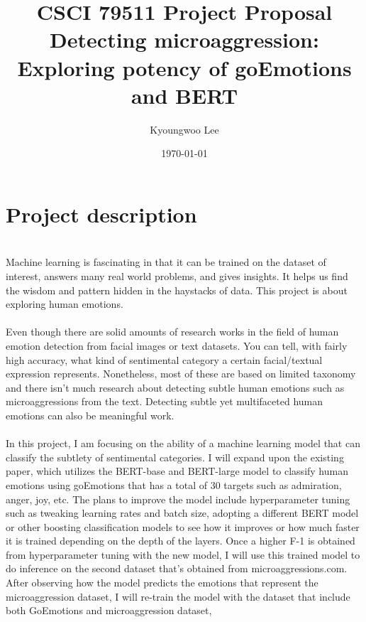 \documentclass[12pt]{main}
\title{
  CSCI 79511 Project Proposal\\ \vspace{3mm} 
  \large Detecting microaggression:
  \\ Exploring potency of goEmotions\cite{goEmotions} and BERT\cite{bert}
}
\author{Kyoungwoo Lee}
\date{\today}
\begin{document}
\maketitle




\section*{Project description}
\\
Machine learning is fascinating in that it can be trained on the dataset of interest,
answers many real world problems, and gives insights.
It helps us find the wisdom and pattern hidden in the haystacks of data.
This project is about exploring human emotions.
\vspace{-2mm}\\
\\
Even though there are solid amounts of research works in the field of human emotion detection
from facial images\cite{Facial} or text\cite{AffectiveComputing} datasets.
You can tell, with fairly high accuracy, what kind of sentimental category a certain facial/textual expression represents.
Nonetheless,  most of these are based on limited taxonomy\cite{basicemotions} and there isn’t much research
about detecting subtle human emotions such as microaggressions from the text.
Detecting subtle yet multifaceted human emotions can also be meaningful work.
\vspace{-2mm}\\
\\
In this project, I am focusing on the ability of a machine learning model that can classify
the subtlety of sentimental categories. I will expand upon the existing paper,
which utilizes the BERT-base and BERT-large model to classify human emotions using goEmotions
that has a total of 30 targets such as admiration, anger, joy, etc.
The plans to improve the model include hyperparameter tuning such as tweaking learning rates and batch size,
adopting a different BERT model or other boosting classification models
to see how it improves or how much faster it is trained depending on the depth of the layers.
Once a higher F-1 is obtained from hyperparameter tuning with the new model,
I will use this trained model to do inference on the second dataset that’s obtained from microaggressions.com.
After observing how the model predicts the emotions that represent the microaggression dataset,
I will re-train the model with the dataset that include both GoEmotions and microaggression dataset,
\end{document}
